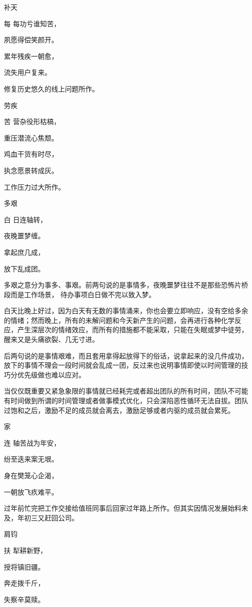 \documentclass{article}
\newenvironment{poem}[3]{
\begin{minipage}{\textwidth}
\begin{pinyinscope}\begin{center}\Large\linespread{1.4}\selectfont #2\end{center}\end{pinyinscope}
\begin{pinyinscope}
	\begin{center}
	\Large\linespread{1.4}\rmfamily\selectfont #3
}{\end{center}
\end{pinyinscope}
\end{minipage}
}
\begin{document}
\begin{poem}{}{补天}
每每功亏谁知苦，

夙愿得偿笑颜开。

累年残疾一朝愈，

流失用户{}复来。
\end{poem}

修复历史悠久的线上问题所作。

\begin{poem}{}{劳疾}
苦营杂役形枯槁，

重压潜流心焦颓。

鸡血干货有时尽，

执念愿景转成灰。
\end{poem}

工作压力过大所作。

\begin{poem}{}{多艰}
白日连轴转，

夜晚噩梦缠。

拿起庶几成，

放下乱成团。
\end{poem}

多艰之意分为事多、事艰。前两句说的是事情多，夜晚噩梦往往不是那些恐怖片桥段而是工作场景， 待办事项白日做不完以致入梦。

白天比晚上好过，因为白天有无数的事情涌来，你也会要立即响应，没有空给多余的情绪；然而晚上，所有的未解问题和今天新产生的问题，会再进行各种化学反应，产生深层次的情绪效应，而所有的措施都不能采取，只能在失眠或梦中徒劳，醒来又是头痛欲裂、几无寸进。

后两句说的是事情艰难，而且套用拿得起放得下的俗话，说拿起来的没几件成功，放下的事情不理会一段时间就会乱成一团，反过来也说明事情即使以时间管理的技巧分优先级做也难以应对。

当仅仅既重要又紧急象限的事情就已经耗完或者超出团队的所有时间，团队不可能有时间做到所谓的时间管理或者做事模式优化，只会深陷恶性循环无法自拔。团队过饱和之后，激励不足的成员就会离去，激励足够或者内驱的成员就会累死。

\begin{poem}{}{{\xpinyin{还}{huan2}}家}
连轴苦战为年安，

纷至迭来案无垠。

身在樊笼心企渴，

一朝放飞疚难平。
\end{poem}

过年前忙完把工作交接给值班同事后回家过年路上所作。但其实因情况发展始料未及，年初三又赶回公司。

\begin{poem}{}{肩钧}
扶犁耕新野，

授将镇旧疆。

奔走拨千斤，

失察辛莫赎。
\end{poem}
\end{document}
